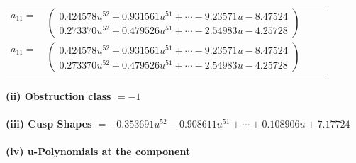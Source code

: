 \documentclass[1p]{elsarticle_modified}
\theoremstyle{definition}
\begin{document}
\begin{tabular}{m{7pt} m{180pt} m{7pt} m{180pt} }
\flushright $a_{11}=$&$\begin{pmatrix}0.424578 u^{52}+0.931561 u^{51}+\cdots-9.23571 u-8.47524\\0.273370 u^{52}+0.479526 u^{51}+\cdots-2.54983 u-4.25728\end{pmatrix}$\\ \flushright $a_{11}=$&$\begin{pmatrix}0.424578 u^{52}+0.931561 u^{51}+\cdots-9.23571 u-8.47524\\0.273370 u^{52}+0.479526 u^{51}+\cdots-2.54983 u-4.25728\end{pmatrix}$\\&\end{tabular}
\flushleft \textbf{(ii) Obstruction class $= -1$}\\~\\
\flushleft \textbf{(iii) Cusp Shapes $= -0.353691 u^{52}-0.908611 u^{51}+\cdots+0.108906 u+7.17724$}\\~\\
\newpage\renewcommand{\arraystretch}{1}
\flushleft \textbf{(iv) u-Polynomials at the component}\newline \\
\end{document}
